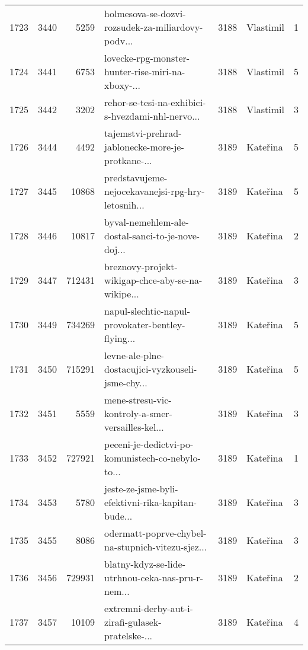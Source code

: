 \begin{tabular}{lrrlrlr}
1723 &       3440 &     5259 &  holmesova-se-dozvi-rozsudek-za-miliardovy-podv... &     3188 &                    Vlastimil &               1 \\
1724 &       3441 &     6753 &  lovecke-rpg-monster-hunter-rise-miri-na-xboxy-... &     3188 &                    Vlastimil &               5 \\
1725 &       3442 &     3202 &  rehor-se-tesi-na-exhibici-s-hvezdami-nhl-nervo... &     3188 &                    Vlastimil &               3 \\
1726 &       3444 &     4492 &  tajemstvi-prehrad-jablonecke-more-je-protkane-... &     3189 &                     Kateřina &               5 \\
1727 &       3445 &    10868 &  predstavujeme-nejocekavanejsi-rpg-hry-letosnih... &     3189 &                     Kateřina &               5 \\
1728 &       3446 &    10817 &  byval-nemehlem-ale-dostal-sanci-to-je-nove-doj... &     3189 &                     Kateřina &               2 \\
1729 &       3447 &   712431 &  breznovy-projekt-wikigap-chce-aby-se-na-wikipe... &     3189 &                     Kateřina &               3 \\
1730 &       3449 &   734269 &  napul-slechtic-napul-provokater-bentley-flying... &     3189 &                     Kateřina &               5 \\
1731 &       3450 &   715291 &  levne-ale-plne-dostacujici-vyzkouseli-jsme-chy... &     3189 &                     Kateřina &               5 \\
1732 &       3451 &     5559 &  mene-stresu-vic-kontroly-a-smer-versailles-kel... &     3189 &                     Kateřina &               3 \\
1733 &       3452 &   727921 &  peceni-je-dedictvi-po-komunistech-co-nebylo-to... &     3189 &                     Kateřina &               1 \\
1734 &       3453 &     5780 &  jeste-ze-jsme-byli-efektivni-rika-kapitan-bude... &     3189 &                     Kateřina &               3 \\
1735 &       3455 &     8086 &  odermatt-poprve-chybel-na-stupnich-vitezu-sjez... &     3189 &                     Kateřina &               3 \\
1736 &       3456 &   729931 &  blatny-kdyz-se-lide-utrhnou-ceka-nas-pru-r-nem... &     3189 &                     Kateřina &               2 \\
1737 &       3457 &    10109 &  extremni-derby-aut-i-zirafi-gulasek-pratelske-... &     3189 &                     Kateřina &               4 \\

\end{tabular}
